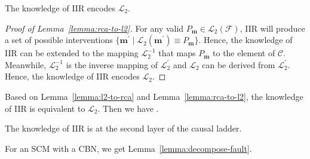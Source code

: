 \begin{lemma}\label{lemma:rca-to-l2}
	The knowledge of IIR encodes $\mathcal{L}_{2}$.
\end{lemma}
\begin{proof}[Proof of Lemma~\ref{lemma:rca-to-l2}]
	For any valid $P_{\mathbf{m}} \in \mathcal{L}_{2}(\mathcal{F})$, IIR will produce a set of possible interventions $\{\mathbf{m}^{\prime} \mid \mathcal{L}_{2}(\mathbf{m}^{\prime}) \equiv P_{\mathbf{m}}\}$.
	Hence, the knowledge of IIR can be extended to the mapping $\mathcal{L}_{2}^{-1}$ that maps $P_{\mathbf{m}}$ to the element of $\mathcal{C}$.
	Meanwhile, $\mathcal{L}_{2}^{-1}$ is the inverse mapping of $\mathcal{L}_{2}^{\prime}$ and $\mathcal{L}_{2}$ can be derived from $\mathcal{L}_{2}^{\prime}$.
	Hence, the knowledge of IIR encodes $\mathcal{L}_{2}$.
\end{proof}

Based on Lemma~\ref{lemma:l2-to-rca} and Lemma~\ref{lemma:rca-to-l2}, the knowledge of IIR is equivalent to $\mathcal{L}_{2}$.
Then we have .

\begin{theorem}\label{thm:irca-l2}
	The knowledge of IIR is at the second layer of the causal ladder.
\end{theorem}

For an SCM with a CBN, we get Lemma~\ref{lemma:decompose-fault}.


